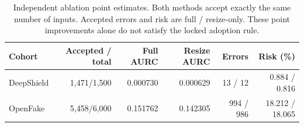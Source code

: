 \begin{table}[t]
\caption{Independent ablation point estimates. Both methods accept exactly the same number of inputs. Accepted errors and risk are full / resize-only. These point improvements alone do not satisfy the locked adoption rule.}
\label{tab:ablation}
\centering\small
\begin{tabular}{lrrrrr}
\toprule
Cohort & Accepted / total & Full AURC & Resize AURC & Errors & Risk (\%) \\
\midrule
DeepShield & 1,471/1,500 & 0.000730 & 0.000629 & 13 / 12 & 0.884 / 0.816 \\
OpenFake & 5,458/6,000 & 0.151762 & 0.142305 & 994 / 986 & 18.212 / 18.065 \\
\bottomrule
\end{tabular}
\end{table}
